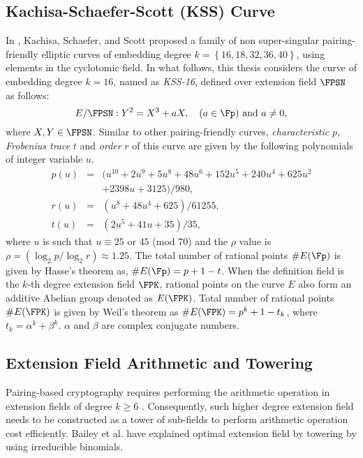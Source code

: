 \subsection{Kachisa-Schaefer-Scott (KSS) Curve}
In \cite{EPRINT:KacSchSco07}, Kachisa, Schaefer, and Scott proposed a family of non super-singular pairing-friendly elliptic curves of embedding degree $k = \left\lbrace16, 18, 32, 36, 40\right\rbrace$, using elements in the cyclotomic field. 
 In what follows, this thesis considers  the curve of embedding degree $k =16$, named as \textit{KSS-16}, defined over extension field $\FPSN$ as follows:
\begin{equation}\label{eq:KSS_16}
E/\FPSN:Y^2=X^3+aX, \quad \mbox{($a \in \Fp$) and  $a \neq 0$},
\end{equation}
 where $X,Y \in \FPSN$. Similar to other pairing-friendly curves,  \textit{characteristic} $p$, \textit{Frobenius trace} $t$ and \textit{order} $r$ of this curve are given by the following polynomials of  integer variable $u$.
\begin{subequations}
\begin{eqnarray}
p(u) &= & (u^{10} +2u^9 +5u^8 +48u^6 +152u^5 +240u^4 +625u^2  \nonumber \\ 
&& +2398u +3125)/980,  \\\label{eq:kss_16_char}
r(u) &= & (u^8 +48u^4 +625)/61255, \label{eq:kss_16_degree}  \\
t(u) &=& (2u^5 +41u+35)/35, \label{eq:kss_16_trace} 
\end{eqnarray}
\end{subequations} 
where $u$ is such that $u \equiv 25$ or $45$ (mod $70$) and the $\rho$ value is $\rho = (\log_2 p/\log_2 r) \approx 1.25$. 
The total number of rational points $\#E(\Fp)$ is given by Hasse's theorem as, $\#E(\Fp) = p+1-t$. 
When the definition field is the $k$-th degree extension field $\FPK$, rational points on the curve $E$ also form an additive Abelian group denoted as $E(\FPK)$. Total number of rational points $\#E(\FPK)$ is given by  Weil's theorem \cite{weil1949numbers} as 
$\#E(\FPK) = p^k +1- t_k$, where $t_k =  \alpha^k + \beta^k$.  $\alpha$ and $\beta$ are  complex conjugate numbers.


\subsection{Extension Field Arithmetic and Towering}
Pairing-based cryptography requires  performing the arithmetic operation in extension fields of degree $k \geq 6$ \cite{Silverman}.
Consequently, such higher degree extension field needs to be constructed as a tower of  sub-fields \cite{EPRINT:BenSco09} to perform arithmetic operation cost efficiently. Bailey et al. \cite{JC:BaiPaa01} have explained optimal extension field by towering by using irreducible binomials.
